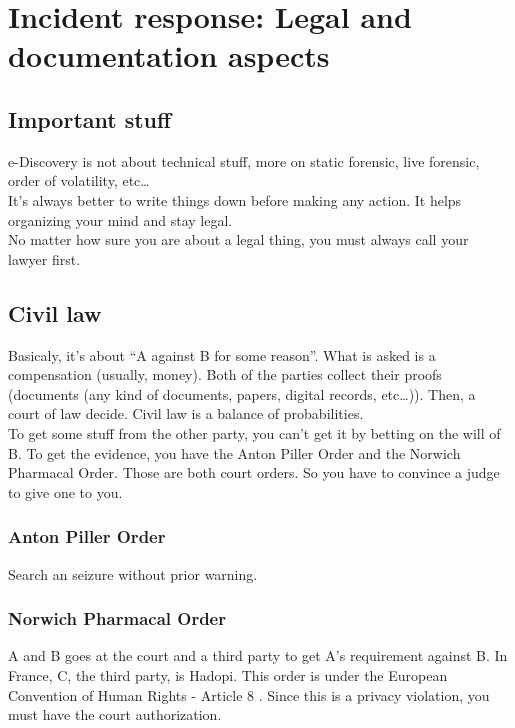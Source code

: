 \section{Incident response: Legal and documentation aspects}
\subsection{Important stuff}
e-Discovery is not about technical stuff, more on static forensic, live forensic, order of volatility, etc\ldots\\
It's always better to write things down before making any action. It helps organizing your mind and stay legal.\\
No matter how sure you are about a legal thing, you must always call your lawyer first.
\subsection{Civil law}
Basicaly, it's about \enquote{A against B for some reason}. What is asked is a compensation (usually, money). Both of the parties collect their proofs (documents (any kind of documents, papers, digital records, etc\ldots)). Then, a court of law decide. Civil law is a balance of probabilities.\\
To get some stuff from the other party, you can't get it by betting on the will of B. To get the evidence, you have the Anton Piller Order and the Norwich Pharmacal Order. Those are both court orders. So you have to convince a judge to give one to you.
\subsubsection{Anton Piller Order}
Search an seizure without prior warning. 
\subsubsection{Norwich Pharmacal Order}
A and B goes at the court and a third party to get A's requirement against B. In France, C, the third party, is Hadopi. This order is under the European Convention of Human Rights - Article 8 \cite{ECHR}. Since this is a privacy violation, you must have the court authorization.
